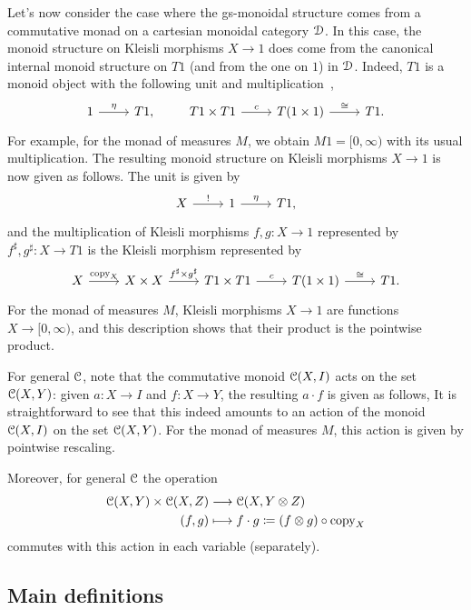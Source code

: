 \documentclass[a4paper,UKenglish,numberwithinsect,cleveref, autoref, thm-restate]{lipics-v2021}
\theoremstyle{plain} %
\theoremstyle{definition} %
\begin{document}
Let's now consider the case where the gs-monoidal structure comes from a commutative monad on a cartesian monoidal category $\mathcal{D}$. 
In this case, the monoid structure on Kleisli morphisms $X\to 1$ does come from the canonical internal monoid structure on $T1$ (and from the one on $1$) in $\mathcal{D}$.
Indeed, $T1$ is a monoid object with the following unit and multiplication~\cite[Section~10]{kock2012distributions},
 \[
 \begin{tikzcd}
  1 \ar{r}{\eta} & T1 ,
 \end{tikzcd}
 \qquad
 \begin{tikzcd}
  T1 \times T1 \ar{r}{c} & T(1\times 1) \ar{r}{\cong} & T1 .
 \end{tikzcd}
 \]
 For example, for the monad of measures $M$, we obtain $M1=[0,\infty)$ with its usual multiplication.
 The resulting monoid structure on Kleisli morphisms $X\to 1$ is now given as follows. The unit is given by
 \[
 \begin{tikzcd}
  X \ar{r}{!} & 1 \ar{r}{\eta} & T1 ,
 \end{tikzcd}
 \]
 and the multiplication of Kleisli morphisms $f, g : X \to 1$ represented by $f^\sharp,g^\sharp:X\to T1$ is the Kleisli morphism represented by
 \[
 \begin{tikzcd}
  X \ar{r}{\mathrm{copy}_X} & X\times X \ar{r}{f^\sharp\times g^\sharp} &
  T1 \times T1 \ar{r}{c} & T(1\times 1) \ar{r}{\cong} & T1 .
 \end{tikzcd}
 \]
 For the monad of measures $M$, Kleisli morphisms $X\to 1$ are functions $X\to [0,\infty)$, and this description shows that their product is the pointwise product.

For general $\mathcal{C}$, note that the commutative monoid $\mathcal{C}(X,I)$ acts on the set $\mathcal{C}(X,Y)$: given $a:X\to I$ and $f:X\to Y$, the resulting $a\cdot f$ is given as follows,
It is straightforward to see that this indeed amounts to an action of the monoid $\mathcal{C}(X,I)$ on the set $\mathcal{C}(X,Y)$.
For the monad of measures $M$, this action is given by pointwise rescaling.

Moreover, for general $\mathcal{C}$ the operation
\begin{align*}
	\mathcal{C}(X,Y) \times \mathcal{C}(X,Z) & \longrightarrow \mathcal{C}(X,Y \otimes Z)		\\
	(f,g) & \longmapsto f\cdot g \coloneqq (f\otimes g)\circ\mathrm{copy}_X
\end{align*}
commutes with this action in each variable (separately). 

\subsection{Main definitions}
\end{document}
